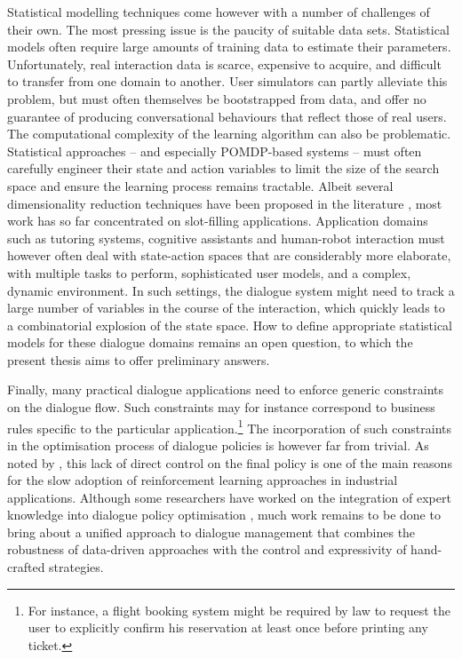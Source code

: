 Statistical modelling techniques come however with a number of challenges of their own. The most pressing issue is the paucity of suitable data sets.  Statistical models often require large amounts of training data to estimate their parameters. Unfortunately, real interaction data is scarce, expensive to acquire, and difficult to transfer from one domain to another.  User simulators can partly alleviate this problem, but must often themselves be bootstrapped from data, and offer no guarantee of producing conversational behaviours that reflect those of real users.  The computational complexity of the learning algorithm can also be problematic. Statistical approaches -- and especially POMDP-based systems -- must often carefully engineer their state and action variables to limit the size of the search space and ensure the learning process remains tractable.  Albeit several dimensionality reduction techniques have been proposed in the literature \citep{williams2005,Young:2010,Cuayahuitl:2010,CrookL11}, most work has so far concentrated on slot-filling applications.  Application domains such as tutoring systems, cognitive assistants and human-robot interaction must however often deal with state-action spaces that are considerably more elaborate, with multiple tasks to perform, sophisticated user models, and a complex, dynamic environment.  In such settings, the dialogue system might need to track a large number of variables in the course of the interaction, which quickly leads to a combinatorial explosion of the state space.  How to define appropriate statistical models for these dialogue domains remains an open question, to which the present thesis aims to offer preliminary answers. 

Finally, many practical dialogue applications need to enforce generic constraints on the dialogue flow.  Such constraints may for instance correspond to business rules specific to the particular application.\footnote{For instance, a flight booking system might be required by law to request the user to explicitly confirm his reservation at least once before printing any ticket.} The incorporation of such constraints in the optimisation process of dialogue policies is however far from trivial. As noted by \cite{Paek:2008}, this lack of direct control on the final policy is one of the main reasons for the slow adoption of reinforcement learning approaches in industrial applications.  Although some researchers have worked on the integration of expert knowledge into dialogue policy optimisation \citep{heeman2007,williams2008}, much work remains to be done to bring about a unified approach to dialogue management that combines the robustness of data-driven approaches with the control and expressivity of hand-crafted strategies. 

